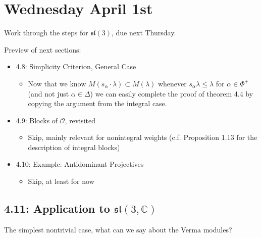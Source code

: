 \documentclass[11pt]{scrartcl}
\theoremstyle{definition}
\theoremstyle{theorem}
\theoremstyle{proof}
\theoremstyle{definition}
\theoremstyle{break}
\theoremstyle{problem}
\providecommand{\tightlist}{%
  \setlength{\itemsep}{0pt}\setlength{\parskip}{0pt}}
\newcommand{\CC}[0]{{\mathbb{C}}}
\newcommand{\liesl}[0]{{\mathfrak{sl}}}
\newcommand{\OO}[0]{{\mathcal{O}}}
\begin{document}
\hypertarget{wednesday-april-1st}{%
\section{Wednesday April 1st}\label{wednesday-april-1st}}

\begin{description}
\tightlist
\item[Exercise]
Work through the steps for \(\liesl(3)\), due next Thursday.
\end{description}

Preview of next sections:

\begin{itemize}
\tightlist
\item
  4.8: Simplicity Criterion, General Case

  \begin{itemize}
  \tightlist
  \item
    Now that we know \(M(s_\alpha \cdot \lambda) \subset M(\lambda)\)
    whenever \(s_\alpha \lambda \leq \lambda\) for \(\alpha \in \Phi^+\)
    (and not just \(\alpha \in \Delta\)) we can easily complete the
    proof of theorem 4.4 by copying the argument from the integral case.
  \end{itemize}
\item
  4.9: Blocks of \(\OO\), revisited

  \begin{itemize}
  \tightlist
  \item
    Skip, mainly relevant for nonintegral weights (c.f. Proposition 1.13
    for the description of integral blocks)
  \end{itemize}
\item
  4.10: Example: Antidominant Projectives

  \begin{itemize}
  \tightlist
  \item
    Skip, at least for now
  \end{itemize}
\end{itemize}

\hypertarget{application-to-liesl3-cc}{%
\subsection{\texorpdfstring{4.11: Application to
\(\liesl(3, \CC)\)}{4.11: Application to \textbackslash liesl(3, \textbackslash CC)}}\label{application-to-liesl3-cc}}

The simplest nontrivial case, what can we say about the Verma modules?
\end{document}
